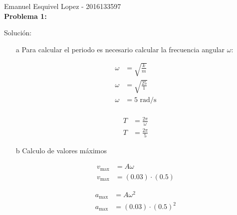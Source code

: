 \documentclass[letterpaper,12pt,addpoints]{exam}
\begin{document}
 
Emanuel Esquivel Lopez - 2016133597\\
\textbf{Problema 1:}\\

{\color{ceruleanblue}
Solución:\\
\begin{enumerate}
\item[a] Para calcular el periodo es necesario calcular la frecuencia angular $\omega$:\\
\begin{minipage}[t]{0.5\textwidth}
\begin{align*}
\omega &= \sqrt{\frac{k}{m}}\\
\omega &= \sqrt{\frac{25}{1}}\\
\omega &= 5\,\,\mathrm{rad/s}\\
\end{align*}
\end{minipage}
\begin{minipage}[t]{0.5\textwidth}
\begin{align*}
T &= \frac{2\pi}{\omega}\\
T &= \frac{2\pi}{5}
\end{align*}
\end{minipage}
\begin{center}
\end{center}

\item[b] Calculo de valores máximos\\
\begin{minipage}[t]{0.5\textwidth}
\begin{align*}
v_{\max} &= A\omega\\
v_{\max} &=(0.03) \cdot (0.5)
\end{align*}
\begin{center}
\end{center}

\end{minipage}
\begin{minipage}[t]{0.5\textwidth}
\begin{align*}
a_{\max} &= A\omega^2\\
a_{\max} &=(0.03) \cdot (0.5)^2
\end{align*}
\begin{center}
\end{center}
\end{minipage}





\end{enumerate}}
\end{document}
